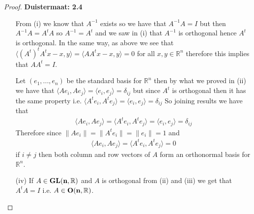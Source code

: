 \documentclass[11pt]{article}
\newcommand{\R}{\mathbb{R}}
\theoremstyle{definition}
\begin{document}
\begin{proof}{\textbf{Duistermaat: 2.4}}
\begin{itemize}
        From (i) we know that $A^{-1}$ exists so we have that $A^{-1}A = I$
        but then $A^{-1}A = A^tA$ so $A^{-1} = A^t$ and we saw in (i) that
        $A^{-1}$ is orthogonal hence $A^t$ is orthogonal.
        In the same way, as above we see that
        $\langle (A^t)^tA^tx - x, y\rangle = \langle AA^tx - x, y\rangle = 0$
        for all $x,y\in \R^n$ therefore this implies that $AA^t = I$.

        Let $(e_1, ..., e_n)$ be the standard basis for $\R^n$ then by
        what we proved in (ii) we have that
        $\langle Ae_i, Ae_j\rangle = \langle e_i, e_j\rangle = \delta_{ij}$
        but since $A^t$ is orthogonal then it has the same property i.e.
        $\langle A^te_i, A^te_j\rangle = \langle e_i, e_j\rangle = \delta_{ij}$
        So joining results we have that
        \begin{align*}
            \langle Ae_i, Ae_j\rangle = \langle A^te_i, A^te_j\rangle
            = \langle e_i, e_j\rangle = \delta_{ij}
        \end{align*}
        Therefore since $\|Ae_i\| = \|A^te_i\| = \|e_i\| = 1$ and
        \begin{align*}
            \langle Ae_i, Ae_j\rangle = \langle A^te_i, A^te_j\rangle = 0
        \end{align*}
        if $i \neq j$ then both column and row vectors of $A$ form an
        orthonormal basis for $\R^n$.
\cleardoublepage
        \item [(iv)] If $A \in \bf{GL}(n, \R)$ and $A$ is orthogonal from (ii)
        and (iii) we get that $A^tA = I$ i.e. $A \in \bf{O}(n, \R)$.


\end{itemize}
\end{proof}
\end{document}
